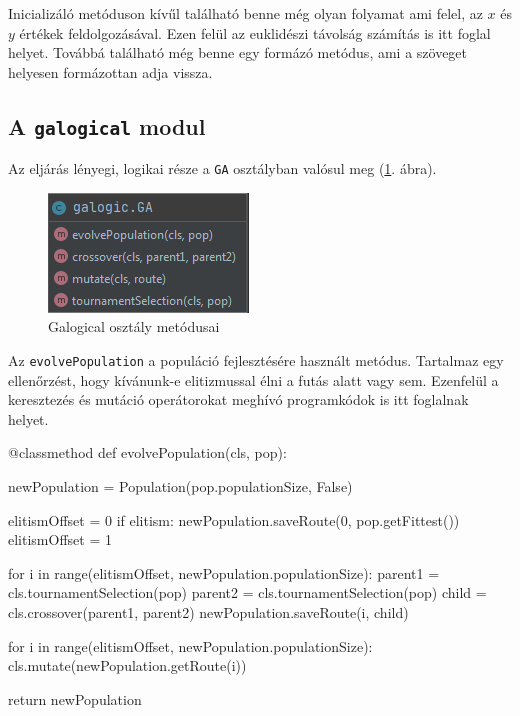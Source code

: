 Inicializáló metóduson kívűl található benne még olyan folyamat ami felel, az $x$ és $y$ értékek feldolgozásával. Ezen felül az euklidészi távolság számítás is itt foglal helyet. Továbbá található még benne egy formázó metódus, ami a szöveget helyesen formázottan adja vissza.

\subsection{A \texttt{galogical} modul}

Az eljárás lényegi, logikai része a \texttt{GA} osztályban valósul meg (\ref{fig:galogical}. ábra).

\begin{figure}[!htb]
\centering
\includegraphics[scale=0.8]{images/galogic.png}
\caption{Galogical osztály metódusai}
\label{fig:galogical}
\end{figure}

Az \texttt{evolvePopulation} a populáció fejlesztésére használt metódus. Tartalmaz egy ellenőrzést, hogy kívánunk-e elitizmussal élni a futás alatt vagy sem. Ezenfelül a keresztezés és mutáció operátorokat meghívó programkódok is itt foglalnak helyet.

\begin{python}
@classmethod
def evolvePopulation(cls, pop):

    newPopulation = Population(pop.populationSize, False)

    elitismOffset = 0
    if elitism:
        newPopulation.saveRoute(0, pop.getFittest())
        elitismOffset = 1

    for i in range(elitismOffset, newPopulation.populationSize):
        parent1 = cls.tournamentSelection(pop)
        parent2 = cls.tournamentSelection(pop)
        child = cls.crossover(parent1, parent2)
        newPopulation.saveRoute(i, child)

    for i in range(elitismOffset, newPopulation.populationSize):
        cls.mutate(newPopulation.getRoute(i))

    return newPopulation
\end{python}

